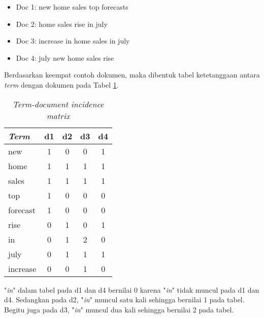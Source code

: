 
\begin{itemize}
	\item Doc 1: new home sales top forecasts
	\item Doc 2: home sales rise in july
	\item Doc 3: increase in home sales in july
	\item Doc 4: july new home sales rise
\end{itemize}

Berdasarkan keempat contoh dokumen, maka dibentuk tabel ketetanggaan antara \textit{term} dengan dokumen pada Tabel \ref{tbl:term-doc}.

\begin{table}[h]
\centering
\begin{tabular}{|l|c|c|c|c|} \hline
	\textit{Term} & d1 & d2 & d3 & d4 \\ \hline
	new		&	1	&	0	&	0	&	1	\\
	home	&	1	&	1	&	1	&	1	\\
	sales	&	1	&	1	&	1	&	1	\\
	top		&	1	&	0	&	0	&	0	\\
	forecast&	1	&	0	&	0	&	0	\\
	rise	&	0	&	1	&	0	&	1	\\
	in		&	0	&	1	&	2	&	0	\\
	july	&	0	&	1	&	1	&	1	\\
	increase&	0	&	0	&	1	&	0	\\ \hline
\end{tabular}
\caption{\textit{Term-document incidence matrix}}
\label{tbl:term-doc}
\end{table}

\Term "\textit{in}" dalam tabel pada d1 dan d4 bernilai 0 karena \term "\textit{in}" tidak muncul pada d1 dan d4. Sedangkan pada d2, \term "\textit{in}" muncul satu kali sehingga bernilai 1 pada tabel. Begitu juga pada d3, \term "\textit{in}" muncul dua kali sehingga bernilai 2 pada tabel.

